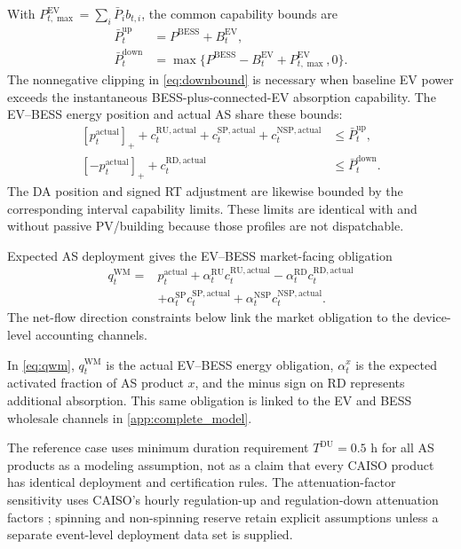 \documentclass[final,5p,times]{elsarticle}
\newcommand{\EV}{\mathrm{EV}}
\newcommand{\BESS}{\mathrm{BESS}}
\newcommand{\RU}{\mathrm{RU}}
\newcommand{\RD}{\mathrm{RD}}
\newcommand{\SP}{\mathrm{SP}}
\newcommand{\NSP}{\mathrm{NSP}}
\newcommand{\WM}{\mathrm{WM}}
\newcommand{\actual}{\mathrm{actual}}
\newcommand{\pos}[1]{\left[#1\right]_{+}}
\begin{document}
With $P_{t,\max}^{\EV}=\sum_i\bar P_i b_{t,i}$, the common capability bounds are
\begin{align}
\bar P_t^{\mathrm{up}}&=P^{\BESS}+B_t^{\EV}, \label{eq:upbound}\\
\bar P_t^{\mathrm{down}}
&=\max\{P^{\BESS}-B_t^{\EV}+P_{t,\max}^{\EV},0\}. \label{eq:downbound}
\end{align}
The nonnegative clipping in \eqref{eq:downbound} is necessary when baseline EV
power exceeds the instantaneous BESS-plus-connected-EV absorption capability.
The EV--BESS energy position and actual AS share these bounds:
\begin{align}
\pos{p_t^{\actual}}+
c_t^{\RU,\actual}+c_t^{\SP,\actual}+c_t^{\NSP,\actual}
&\le\bar P_t^{\mathrm{up}}, \label{eq:up_envelope}\\
\pos{-p_t^{\actual}}+c_t^{\RD,\actual}
&\le\bar P_t^{\mathrm{down}}. \label{eq:down_envelope}
\end{align}
The DA position and signed RT adjustment are likewise bounded by the
corresponding interval capability limits. These limits are identical with and
without passive PV/building because those profiles are not dispatchable.

Expected AS deployment gives the EV--BESS market-facing obligation
\begin{align}
q_t^{\WM}={}&p_t^{\actual}
+\alpha_t^{\RU}c_t^{\RU,\actual}
-\alpha_t^{\RD}c_t^{\RD,\actual}\nonumber\\
&+\alpha_t^{\SP}c_t^{\SP,\actual}
+\alpha_t^{\NSP}c_t^{\NSP,\actual}. \label{eq:qwm}
\end{align}
The net-flow direction constraints below link the market obligation to the device-level accounting channels.

In \eqref{eq:qwm}, $q_t^{\WM}$ is the actual EV--BESS energy obligation,
$\alpha_t^x$ is the expected activated fraction of AS product $x$, and the
minus sign on RD represents additional absorption. This same obligation is
linked to the EV and BESS wholesale channels in \ref{app:complete_model}.

The reference case uses minimum duration requirement $T^{\mathrm{DU}}=0.5$ h for all AS products as a modeling
assumption, not as a claim that every CAISO product has identical deployment
and certification rules. The attenuation-factor sensitivity uses CAISO's hourly
regulation-up and regulation-down attenuation factors
\cite{caisoAttenuation2025}; spinning and non-spinning reserve retain explicit
assumptions unless a separate event-level deployment data set is supplied.
\end{document}
